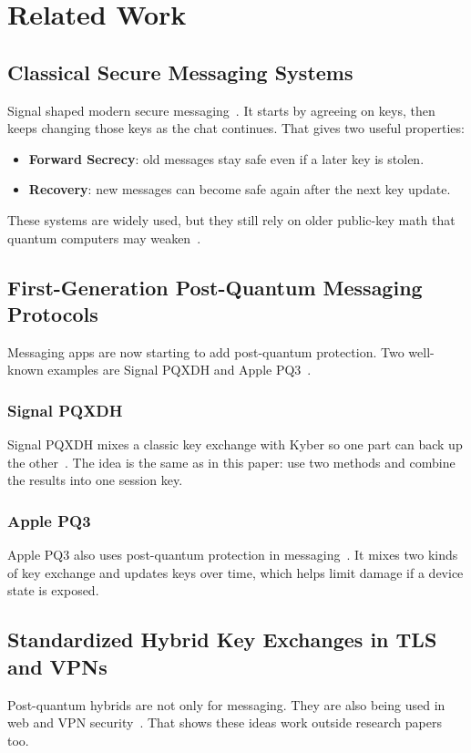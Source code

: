 \section{Related Work}

\subsection{Classical Secure Messaging Systems}
Signal shaped modern secure messaging~\cite{doubleratchet}. It starts by agreeing on keys, then keeps changing those keys as the chat continues. That gives two useful properties:
\begin{itemize}
    \item \textbf{Forward Secrecy}: old messages stay safe even if a later key is stolen.
    \item \textbf{Recovery}: new messages can become safe again after the next key update.
\end{itemize}
These systems are widely used, but they still rely on older public-key math that quantum computers may weaken~\cite{shor}.

\subsection{First-Generation Post-Quantum Messaging Protocols}
Messaging apps are now starting to add post-quantum protection. Two well-known examples are Signal PQXDH and Apple PQ3~\cite{pqxdh,pq3}.

\subsubsection{Signal PQXDH}
Signal PQXDH mixes a classic key exchange with Kyber so one part can back up the other~\cite{pqxdh}. The idea is the same as in this paper: use two methods and combine the results into one session key.

\subsubsection{Apple PQ3}
Apple PQ3 also uses post-quantum protection in messaging~\cite{pq3}. It mixes two kinds of key exchange and updates keys over time, which helps limit damage if a device state is exposed.

\subsection{Standardized Hybrid Key Exchanges in TLS and VPNs}
Post-quantum hybrids are not only for messaging. They are also being used in web and VPN security~\cite{ietf_hybrid_tls,ietf_hybrid_ike}. That shows these ideas work outside research papers too.

